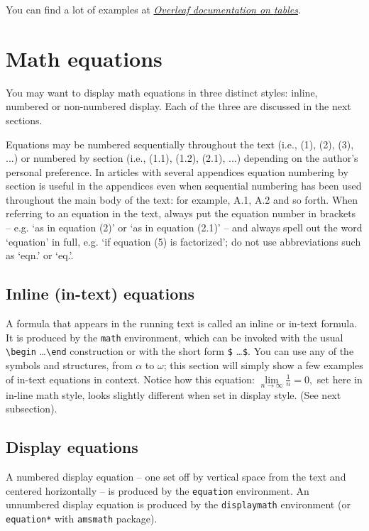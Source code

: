 \documentclass[a4paper]{jpconf}
\begin{document}
You can find a lot of examples at \href{https://www.overleaf.com/learn/latex/Tables}{\textit{Overleaf documentation on tables}}. 

\section{Math equations}

You may want to display math equations in three distinct styles:
inline, numbered or non-numbered display.  Each of the three are
discussed in the next sections.

Equations may be numbered sequentially throughout the text (i.e., (1), (2), (3), ...) 
or numbered by section (i.e., (1.1), (1.2), (2.1), ...) depending on the author’s personal preference. 
In articles with several appendices equation numbering by section is useful in the appendices even 
when sequential numbering has been used throughout the main body of the text: for example, 
A.1, A.2 and so forth. When referring to an equation in the text, always put the equation number 
in brackets -- e.g. ‘as in equation (2)’ or ‘as in equation (2.1)’ -- and always spell out the word ‘equation’ 
in full, e.g. ‘if equation (5) is factorized’; do not use abbreviations such as ‘eqn.’ or ‘eq.’.

\subsection{Inline (in-text) equations}

A formula that appears in the running text is called an inline or
in-text formula.  It is produced by the \verb|math| environment,
which can be invoked with the usual
\verb|\begin| \ldots \verb|\end| construction or with
the short form \verb|$| \ldots \verb|$|. You can use any of the symbols
and structures, from $\alpha$ to $\omega$;
this section will simply show a few
examples of in-text equations in context. Notice how this equation:
\begin{math}
  \lim\limits_{n\rightarrow \infty} \frac{1}{n} = 0,
\end{math}
set here in in-line math style, looks slightly different when
set in display style.  (See next subsection).

\subsection{Display equations}

A numbered display equation -- one set off by vertical space from the
text and centered horizontally -- is produced by the \verb|equation|
environment. An unnumbered display equation is produced by the
\verb|displaymath| environment (or \verb|equation*| with \verb|amsmath| package).
\end{document}

